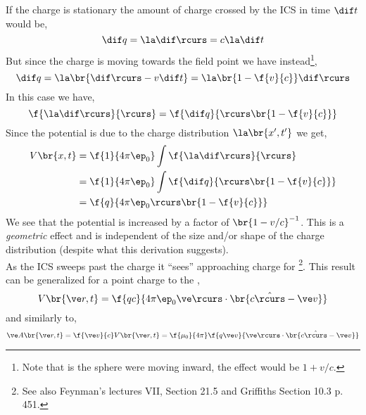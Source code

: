\documentclass{article}
\begin{document}
If the charge is stationary the amount of charge crossed by the ICS in time $\dif t$ would be,
\[ \dif q = \la \dif \rcurs = c \la \dif t \]
But since the charge is moving towards the field point we have instead\footnote{Note that is the sphere were moving inward, the effect would be $1 + v /c$.},
\[ \dif q = \la \br{\dif \rcurs - v \dif t} = \la \br{1 - \f{v}{c}} \dif \rcurs \]
In this case we have,
\[ \f{\la \dif \rcurs}{\rcurs} = \f{\dif q}{\rcurs \br{1 - \f{v}{c}}} \]
Since the potential is due to the charge distribution $\la \br{x', t'}$ we get,
\begin{align*}
    V\br{x,t}
    &= \f{1}{4\pi\ep_0} \int \f{\la \dif \rcurs}{\rcurs} \\
    &= \f{1}{4\pi\ep_0} \int \f{\dif q}{\rcurs \br{1 - \f{v}{c}}} \\
    &= \f{q}{4\pi\ep_0 \rcurs \br{1 - \f{v}{c}}}
\end{align*}
We see that the potential is increased by a factor of $\br{1 - v/c}^{-1}$. This is a \textit{geometric} effect and is independent of the size and/or shape of the charge distribution (despite what this derivation suggests). \\

As the ICS sweeps past the charge it ``sees'' approaching charge for \footnote{See also Feynman's lectures VII, Section 21.5 and Griffiths Section 10.3 p. 451.}. This result can be generalized for a point charge to the ,
\[ V\br{\ve r, t} = \f{qc}{4 \pi \ep_0 \ve \rcurs \cdot \br{c \hat \rcurs - \ve v}} \]
and similarly to,
\[ \ve A \br{\ve r, t} = \f{\ve v}{c} V\br{\ve r, t} = \f{\mu_0}{4 \pi}\f{q \ve v}{\ve \rcurs \cdot \br{c \hat \rcurs - \ve v}} \]
\end{document}
